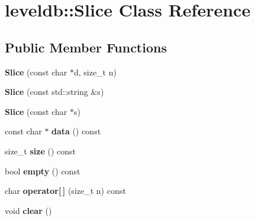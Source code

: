 \hypertarget{classleveldb_1_1_slice}{}\section{leveldb\+:\+:Slice Class Reference}
\label{classleveldb_1_1_slice}
\subsection*{Public Member Functions}
\begin{DoxyCompactItemize}
\item 
\mbox{\label{classleveldb_1_1_slice_ae77bd1d4353bd94d768474d467657c85}} 
{\bfseries Slice} (const char $\ast$d, size\+\_\+t n)
\item 
\mbox{\label{classleveldb_1_1_slice_ab79b60f33aa094179fe36880bc220853}} 
{\bfseries Slice} (const std\+::string \&s)
\item 
\mbox{\label{classleveldb_1_1_slice_a429c530560405fe1a7cd745f7afecf5a}} 
{\bfseries Slice} (const char $\ast$s)
\item 
\mbox{\label{classleveldb_1_1_slice_a94ccee3d05b66ba0b059f2d9772b782b}} 
const char $\ast$ {\bfseries data} () const
\item 
\mbox{\label{classleveldb_1_1_slice_a7344120beda110de81d0c45d4cfe4b63}} 
size\+\_\+t {\bfseries size} () const
\item 
\mbox{\label{classleveldb_1_1_slice_a56ac7a70125c26187ecf4dd040004582}} 
bool {\bfseries empty} () const
\item 
\mbox{\label{classleveldb_1_1_slice_aea62da83ffa80f22e065b15ca8596726}} 
char {\bfseries operator\mbox{[}$\,$\mbox{]}} (size\+\_\+t n) const
\item 
\mbox{\label{classleveldb_1_1_slice_ab9b6e340e8a483a5cf713f6be17709e3}} 
void {\bfseries clear} ()
\item 
\mbox{\label{classleveldb_1_1_slice_a1be5b22958a115ebecb2b017aad2b3f6}} 

\end{DoxyCompactItemize}
